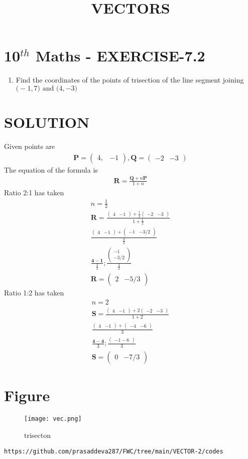 \documentclass[12pt]{article}
\newcommand{\myvec}[1]{\ensuremath{\begin{pmatrix}#1\end{pmatrix}}}
\let\vec\mathbf
\begin{document}
\begin{center}
\title{\textbf{VECTORS}}
\date{\vspace{-5ex}} %
\maketitle
\end{center}

\section{10$^{th}$ Maths - EXERCISE-7.2}

\begin{enumerate}
\item Find the coordinates of the points of trisection of the line segment joining $\vec(-1, 7) \text{ and } \vec(4, -3)$ 
\end{enumerate}

\section{SOLUTION}
Given points are
\begin{align}
\vec{P}=\myvec{4,& -1} ,
\vec{Q}=\myvec{-2& -3}
\end{align}
The equation of the formula is
\begin{align}
\vec{R}=\frac{\vec{Q}+n\vec{P}}{1+n}
\end{align}
Ratio 2:1 has taken 
\begin{align}
n=\frac{1}{2}\\
\vec{R}=\frac{\myvec{4&-1}+\frac{1}{2}\myvec{-2&-3}}{1+\frac{1}{2}} \\
\frac{\myvec{4&-1}+\myvec{-1&-3/2}}{\frac{3}{2}}\\
\frac{\vec{4-1}}{\frac{3}{2}};\frac{\myvec{-1\\ -3/2}}{\frac{3}{2}}\\
\vec{R}=\myvec{2 & -5/3}
\end{align}
Ratio 1:2 has taken
\begin{align}
n=2\\
\vec{S}=\frac{\myvec{4& -1}+2\myvec{-2& -3}}{1+2} \\
\frac{\myvec{4& -1}+\myvec{-4& -6}}{3}\\
\frac{\vec{4-4}}{3};\frac{\myvec{-1-6}}{3}\\
\vec{S}=\myvec{0& -7/3}
\end{align}

\section{Figure}
\begin{figure}[h]
\centering
\texttt{[image: vec.png]}
\caption{trisecton}
		\label{fig:Figure}
\end{figure}
\begin{lstlisting}
https://github.com/prasaddeva287/FWC/tree/main/VECTOR-2/codes
\end{lstlisting}
\end{document}
